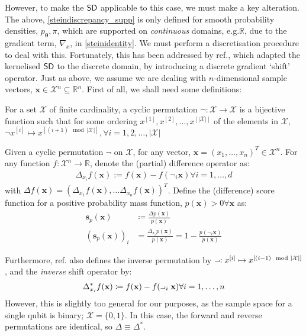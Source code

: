 However, to make the $\operatorname{\textsf{SD}}$ applicable to this case, we must make a key alteration. The above, \eqref{steindiscrepancy_supp} is only defined for smooth probability densities, $p_{\boldsymbol\theta}, \pi$, which are supported on \textit{continuous} domains, e.g.\@ $\mathbb{R}$, due to the gradient term, $\nabla_x$, in \eqref{steinidentity}. We must perform a discretisation procedure to deal with this. Fortunately, this has been addressed by ref., which adapted the kernelised $\operatorname{\textsf{SD}}$ to the discrete domain, by introducing a discrete gradient `shift' operator. Just as above, we assume we are dealing with $n$-dimensional sample vectors, $\mathbf{x}\in \mathcal{X}^n \subseteq \mathbb{R}^n$. First of all, we shall need some definitions:

\begin{definition}
For a set $\mathcal{X}$ of finite cardinality, a cyclic permutation $\neg:\mathcal{X} \rightarrow \mathcal{X}$ is a bijective function such that for some ordering $x^{[1]},x^{[2]}, \dots, x^{[|\mathcal{X}|]}$ of the elements in $\mathcal{X}$, $\neg x^{[i]} \mapsto x^{[(i+1)\mod|\mathcal{X}|]}, \forall i = 1,2,\dots, |\mathcal{X}|$
\end{definition}
\begin{definition}
Given a cyclic permutation  $\neg$ on $\mathcal{X}$, for any vector, $\mathbf{x} = (x_1, \dots, x_n)^T \in \mathcal{X}^n$. For any function $f:\mathcal{X}^n \rightarrow \mathbb{R}$, denote the (partial) difference operator as:
\begin{align}
    \Delta_{x_i}f(\mathbf{x}) := f(\mathbf{x}) - f(\neg_i\mathbf{x}) \forall i=1, \dots, d \label{discreteshiftoperator}
\end{align}
with $\Delta f(\mathbf{x}) = (\Delta_{x_1}f(\mathbf{x}), \dots \Delta_{x_n}f(\mathbf{x}))^T$. Define the (difference) score function for a positive probability mass function, $p(\mathbf{x}) > 0 \forall \mathbf{x}$ as:
\begin{align}
    \mathbf{s}_p(\mathbf{x}) &  \coloneqq \frac{\Delta p(\mathbf{x})}{p(\mathbf{x})} \label{discretescorefunction}\\
    (\mathbf{s}_p(\mathbf{x}))_i &= \frac{\Delta_{x_i} p(\mathbf{x})}{p(\mathbf{x})} = 1 -  \frac{p(\neg_i\mathbf{x})}{p(\mathbf{x})}
\end{align}
\end{definition}
Furthermore, ref. also defines the inverse permutation by $\revneg: x^{[i]} \mapsto x^{[(i-1)\mod|\mathcal{X}|]}$, and the \textit{inverse} shift operator by:
\begin{align}
    \Delta^*_{x_i}f(\mathbf{x})  \coloneqq f(\mathbf{x}) - f(\revneg_i\mathbf{x}) \forall i=1, \dots, n \label{inversediscreteshiftoperator}
\end{align}
However, this is slightly too general for our purposes, as the sample space for a single qubit is binary; $\mathcal{X} = \{0, 1\}$. In this case, the forward and reverse permutations are identical, so $\Delta \equiv \Delta^*$.

